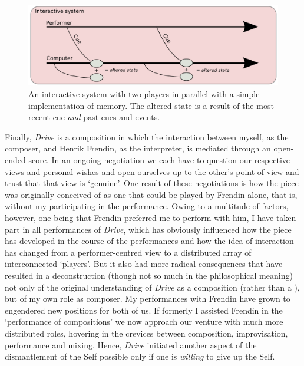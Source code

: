 \begin{figure}
  \centering
  \includegraphics[width=0.95\linewidth]{img/parallel}
  \caption[Scheme of a simple interactive system with memory.]{An interactive system with two players in parallel with a simple implementation of memory. The altered state is a result of the most recent cue \emph{and} past cues and events.}
  \label{fig:parllel}
\end{figure}
Finally, \emph{Drive} is a composition in which the interaction between myself, as the composer, and Henrik Frendin, as the interpreter, is mediated through an open-ended score. In an ongoing negotiation we each have to question our respective views and personal wishes and open ourselves up to the other's point of view and trust that that view is `genuine'. One result of these negotiations is how the piece was originally conceived of as one that could be played by Frendin alone, that is, without my participating in the performance. Owing to a multitude of factors, however, one being that Frendin preferred me to perform with him, I have taken part in all performances of \emph{Drive}, which has obviously influenced how the piece has developed in the course of the performances and how the idea of interaction has changed from a performer-centred view to a distributed array of interconnected `players'. But it also had more radical consequences that have resulted in a deconstruction (though not so much in the philosophical meaning) not only of the original understanding of \emph{Drive} as a composition (rather than a ), but of my own role as composer. My performances with Frendin have grown to engendered new positions for both of us. If formerly I assisted Frendin in the `performance of compositions' we now approach our venture with much more distributed roles, hovering in the crevices between composition, improvisation, performance and mixing. Hence, \emph{Drive} initiated another aspect of the dismantlement of the Self possible only if one is \emph{willing} to give up the Self.

